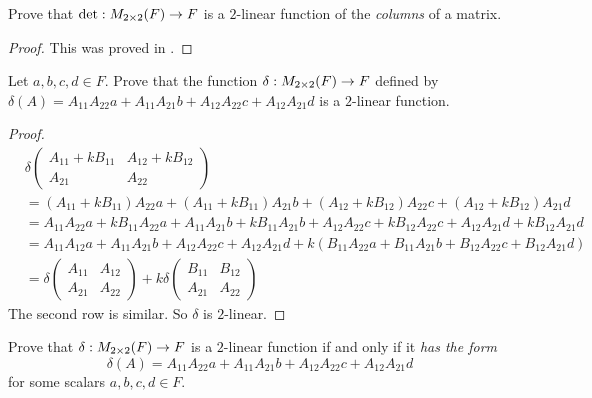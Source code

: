 \begin{exercise} \label{exercise 4.5.13}
Prove that \(\det: M_{2 \times 2}(F) \to F\) is a \(2\)-linear function of the \emph{columns} of a matrix.
\end{exercise}

\begin{proof}
This was proved in .
\end{proof}

\begin{exercise} \label{exercise 4.5.14}
Let \(a, b, c, d \in F\).
Prove that the function \(\delta: M_{2 \times 2}(F) \to F\) defined by \(\delta(A) = A_{11}A_{22}a + A_{11}A_{21}b + A_{12}A_{22}c + A_{12}A_{21}d\) is a \(2\)-linear function.
\end{exercise}

\begin{proof}
\begin{align*}
    & \delta \begin{pmatrix}
        A_{11} + k B_{11} & A_{12} + k B_{12} \\
        A_{21} & A_{22}
    \end{pmatrix} \\
    & = (A_{11} + k B_{11}) A_{22} a + (A_{11} + k B_{11}) A_{21} b + (A_{12} + k B_{12}) A_{22} c + (A_{12} + k B_{12}) A_{21} d \\
    & = A_{11} A_{22} a + k B_{11} A_{22} a
      + A_{11} A_{21} b + k B_{11} A_{21} b
      + A_{12} A_{22} c + k B_{12} A_{22} c
      + A_{12} A_{21} d + k B_{12} A_{21} d \\
    & = A_{11} A_{12} a + A_{11} A_{21} b + A_{12} A_{22} c + A_{12} A_{21} d + k \left( B_{11} A_{22} a + B_{11} A_{21} b + B_{12} A_{22} c + B_{12} A_{21} d \right) \\
    & = \delta \begin{pmatrix}
        A_{11} & A_{12} \\
        A_{21} & A_{22}
    \end{pmatrix}
      + k \delta \begin{pmatrix}
        B_{11} & B_{12} \\
        A_{21} & A_{22}
    \end{pmatrix}
\end{align*}
The second row is similar.
So \(\delta\) is \(2\)-linear.
\end{proof}

\begin{exercise} \label{exercise 4.5.15}
Prove that \(\delta: M_{2 \times 2}(F) \to F\) is a \(2\)-linear function if and only if it \emph{has the form}
\[
    \delta(A) = A_{11}A_{22}a + A_{11}A_{21}b + A_{12}A_{22}c + A_{12}A_{21}d
\]
for some scalars \(a, b, c, d \in F\).
\end{exercise}

